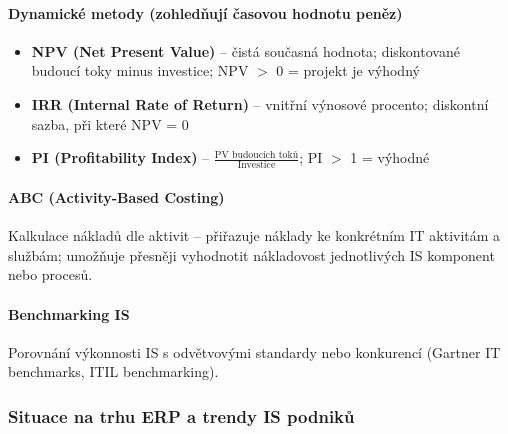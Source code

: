 \paragraph{Dynamické metody (zohledňují časovou hodnotu peněz)}
\begin{itemize}
  \item \textbf{NPV (Net Present Value)} -- čistá současná hodnota; diskontované budoucí toky minus investice;
    NPV $>$ 0 = projekt je výhodný
  \item \textbf{IRR (Internal Rate of Return)} -- vnitřní výnosové procento; diskontní sazba, při které NPV = 0
  \item \textbf{PI (Profitability Index)} -- $\frac{\text{PV budoucích toků}}{\text{Investice}}$; PI $>$ 1 = výhodné
\end{itemize}

\paragraph{ABC (Activity-Based Costing)}
Kalkulace nákladů dle aktivit -- přiřazuje náklady ke konkrétním IT aktivitám a službám;
umožňuje přesněji vyhodnotit nákladovost jednotlivých IS komponent nebo procesů.

\paragraph{Benchmarking IS}
Porovnání výkonnosti IS s odvětvovými standardy nebo konkurencí (Gartner IT benchmarks, ITIL benchmarking).

\subsubsection{Situace na trhu ERP a trendy IS podniků}

